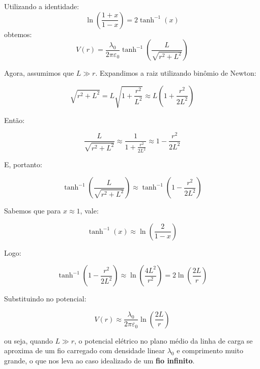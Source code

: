 \documentclass[a4paper,12pt]{article}
\begin{document}
Utilizando a identidade:
\begin{equation}
\ln \left( \frac{1 + x}{1 - x} \right) = 2 \tanh^{-1}(x)
\end{equation}
obtemos:
\begin{equation}
V(r) = \frac{\lambda_0}{2\pi \varepsilon_0} \tanh^{-1} \left( \frac{L}{\sqrt{r^2 + L^2}} \right)
\end{equation}

Agora, assumimos que $L \gg r$. Expandimos a raiz utilizando binômio de Newton:

\begin{equation}
\sqrt{r^2 + L^2} = L \sqrt{1 + \frac{r^2}{L^2}} \approx L \left( 1 + \frac{r^2}{2L^2} \right)
\end{equation}

Então:

\begin{equation}
\frac{L}{\sqrt{r^2 + L^2}} \approx \frac{1}{1 + \frac{r^2}{2L^2}} \approx 1 - \frac{r^2}{2L^2}
\end{equation}

E, portanto:

\begin{equation}
\tanh^{-1} \left( \frac{L}{\sqrt{r^2 + L^2}} \right) \approx \tanh^{-1} \left( 1 - \frac{r^2}{2L^2} \right)
\end{equation}

Sabemos que para $x \approx 1$, vale:

\begin{equation}
\tanh^{-1}(x) \approx \ln \left( \frac{2}{1 - x} \right)
\end{equation}

Logo:

\begin{equation}
\tanh^{-1} \left( 1 - \frac{r^2}{2L^2} \right) \approx \ln \left( \frac{4L^2}{r^2} \right) = 2 \ln \left( \frac{2L}{r} \right)
\end{equation}

Substituindo no potencial:

\begin{equation}
V(r) \approx \frac{\lambda_0}{2\pi \varepsilon_0} \ln \left( \frac{2L}{r} \right)
\end{equation}

ou seja, quando $L \gg r$, o potencial elétrico no plano médio da linha de carga se aproxima de 
um fio carregado com densidade linear $\lambda_0$ e comprimento muito grande, o que nos leva 
ao caso idealizado de um \textbf{fio infinito}.
\end{document}

